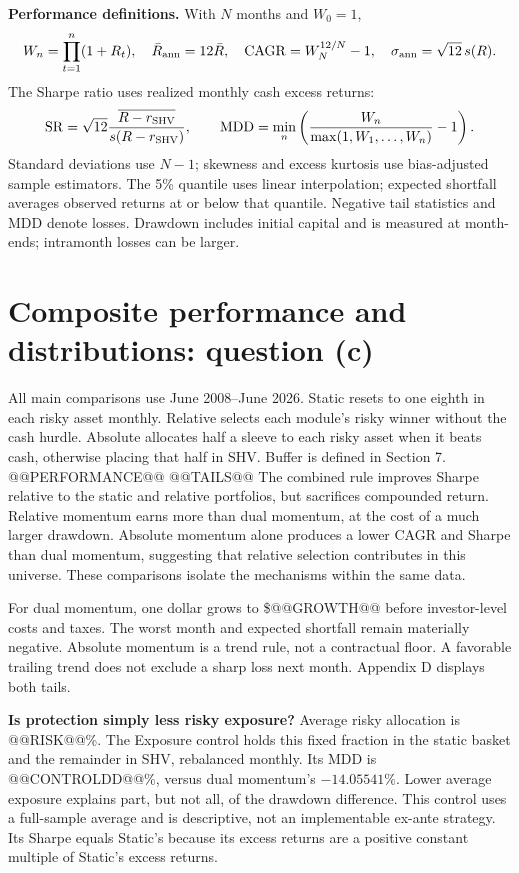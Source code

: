 \documentclass[11pt,letterpaper]{article}
\begin{document}
\textbf{Performance definitions.} With \(N\) months and \(W_0=1\),
\[
 W_n=\prod_{t=1}^{n}(1+R_t),\quad
 \bar R_{\rm ann}=12\bar R,\quad
 {\rm CAGR}=W_N^{12/N}-1,\quad
 \sigma_{\rm ann}=\sqrt{12}\,s(R).
\]
The Sharpe ratio uses realized monthly cash excess returns:
\[
 {\rm SR}=\sqrt{12}\frac{\overline{R-r_{\mathrm{SHV}}}}
 {s(R-r_{\mathrm{SHV}})},\qquad
 {\rm MDD}=\min_n\left(\frac{W_n}{\max(1,W_1,\ldots,W_n)}-1\right).
\]
Standard deviations use \(N-1\); skewness and excess kurtosis use bias-adjusted sample estimators. The 5\% quantile uses linear interpolation; expected shortfall averages observed returns at or below that quantile. Negative tail statistics and MDD denote losses. Drawdown includes initial capital and is measured at month-ends; intramonth losses can be larger.

\newpage
\section{Composite performance and distributions: question (c)}
All main comparisons use June 2008--June 2026. Static resets to one eighth in each risky asset monthly. Relative selects each module's risky winner without the cash hurdle. Absolute allocates half a sleeve to each risky asset when it beats cash, otherwise placing that half in SHV. Buffer is defined in Section 7.
@@PERFORMANCE@@
@@TAILS@@
The combined rule improves Sharpe relative to the static and relative portfolios, but sacrifices compounded return. Relative momentum earns more than dual momentum, at the cost of a much larger drawdown. Absolute momentum alone produces a lower CAGR and Sharpe than dual momentum, suggesting that relative selection contributes in this universe. These comparisons isolate the mechanisms within the same data.

For dual momentum, one dollar grows to \$@@GROWTH@@ before investor-level costs and taxes. The worst month and expected shortfall remain materially negative. Absolute momentum is a trend rule, not a contractual floor. A favorable trailing trend does not exclude a sharp loss next month. Appendix D displays both tails.

\textbf{Is protection simply less risky exposure?} Average risky allocation is @@RISK@@\%. The Exposure control holds this fixed fraction in the static basket and the remainder in SHV, rebalanced monthly. Its MDD is @@CONTROLDD@@\%, versus dual momentum's \(-14.05541\%\). Lower average exposure explains part, but not all, of the drawdown difference. This control uses a full-sample average and is descriptive, not an implementable ex-ante strategy. Its Sharpe equals Static's because its excess returns are a positive constant multiple of Static's excess returns.
\end{document}
